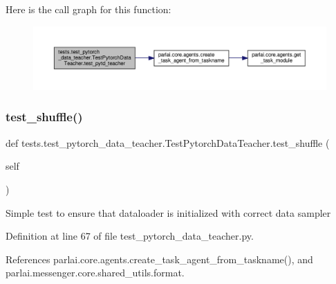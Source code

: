 Here is the call graph for this function\+:
\nopagebreak
\begin{figure}[H]
\begin{center}
\leavevmode
\includegraphics[width=350pt]{classtests_1_1test__pytorch__data__teacher_1_1TestPytorchDataTeacher_a3ff18909bd05956b4fa7970bc3c96afb_cgraph}
\end{center}
\end{figure}
\mbox{\label{classtests_1_1test__pytorch__data__teacher_1_1TestPytorchDataTeacher_aaecd01e211d3e5b0c87f58da6c9b3def}} 
\subsubsection{\texorpdfstring{test\+\_\+shuffle()}{test\_shuffle()}}
{\footnotesize\ttfamily def tests.\+test\+\_\+pytorch\+\_\+data\+\_\+teacher.\+Test\+Pytorch\+Data\+Teacher.\+test\+\_\+shuffle (\begin{DoxyParamCaption}\item[{}]{self }\end{DoxyParamCaption})}

\begin{DoxyVerb}Simple test to ensure that dataloader is initialized with correct
data sampler
\end{DoxyVerb}
 

Definition at line 67 of file test\+\_\+pytorch\+\_\+data\+\_\+teacher.\+py.



References parlai.\+core.\+agents.\+create\+\_\+task\+\_\+agent\+\_\+from\+\_\+taskname(), and parlai.\+messenger.\+core.\+shared\+\_\+utils.\+format.

